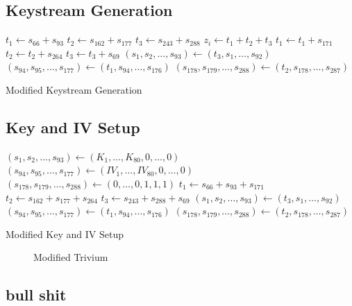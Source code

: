 \documentclass[conference]{IEEEtran}
\begin{document}
\subsection{Keystream Generation}

\begin{algorithm}[H]
\begin{algorithmic}[1]
 
\State $t_1 \gets s_{66} + s_{93}$
\State $t_2 \gets s_{162} + s_{177}$
\State $t_3 \gets s_{243} + s_{288}$
\State
\State $z_i \gets t_1 + t_2 + t_3$
\State
\State $t_1 \gets t_1 + s_{171}$
\State $t_2 \gets t_2 + s_{264}$
\State $t_3 \gets t_3 + s_{69}$
\State
\State $(s_1,s_2,\dots,s_{93}) \gets (t_3,s_1,\dots,s_{92})$
\State $(s_{94},s_{95},\dots,s_{177}) \gets (t_1,s_{94},\dots,s_{176})$
\State $(s_{178},s_{179},\dots,s_{288}) \gets (t_2,s_{178},\dots,s_{287})$
\EndFor
\end{algorithmic}
\caption{Modified Keystream Generation}
\end{algorithm}

\subsection{Key and IV Setup}

\begin{algorithm}[H]
\begin{algorithmic}[1]
\State $(s_1,s_2,\dots,s_{93}) \gets (K_1,\dots,K_{80},0,\dots,0)$
\State $(s_{94},s_{95},\dots,s_{177}) \gets (IV_1,\dots,IV_{80},0,\dots,0)$
\State $(s_{178},s_{179},\dots,s_{288}) \gets (0,\dots,0,1,1,1)$
\State
{}
\State $t_1 \gets s_{66} + s_{93} + s_{171}$
\State $t_2 \gets s_{162} + s_{177} + s_{264}$
\State $t_3 \gets s_{243} + s_{288}+ s_{69}$
\State
\State $(s_1,s_2,\dots,s_{93}) \gets (t_3,s_1,\dots,s_{92})$
\State $(s_{94},s_{95},\dots,s_{177}) \gets (t_1,s_{94},\dots,s_{176})$
\State $(s_{178},s_{179},\dots,s_{288}) \gets (t_2,s_{178},\dots,s_{287})$
\EndFor
\end{algorithmic}
\caption{Modified Key and IV Setup}
\end{algorithm}

\begin{figure}[H]
\centering

\caption{Modified Trivium}
\label{fig:modified}
\end{figure}



\subsection{bull shit}
\end{document}
